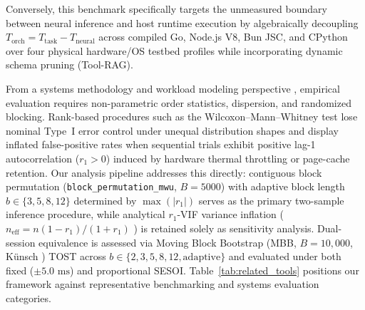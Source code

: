 \documentclass[11pt,a4paper]{article}
\begin{document}
Conversely, this benchmark specifically targets the unmeasured boundary between neural inference and host runtime execution by algebraically decoupling $T_{\text{orch}} = T_{\text{task}} - T_{\text{neural}}$ across compiled Go, Node.js V8, Bun JSC, and CPython over four physical hardware/OS testbed profiles while incorporating dynamic schema pruning (Tool-RAG).

From a systems methodology and workload modeling perspective \cite{kalibera2013rigorous, hoefler2015scientific, maricq2018taming, weaver2013nondeterminism, feitelson2015workload, zilberman2020benchmarking}, empirical evaluation requires non-parametric order statistics, dispersion, and randomized blocking. Rank-based procedures such as the Wilcoxon--Mann--Whitney test \cite{mann1947test} lose nominal Type~I error control under unequal distribution shapes \cite{zimmerman1993rank, fagerland2009wilcoxon} and display inflated false-positive rates when sequential trials exhibit positive lag-1 autocorrelation ($r_1 > 0$) induced by hardware thermal throttling or page-cache retention. Our analysis pipeline addresses this directly: contiguous block permutation (\texttt{block\_permutation\_mwu}, $B=5000$) with adaptive block length $b \in \{3, 5, 8, 12\}$ determined by $\max(|r_1|)$ serves as the primary two-sample inference procedure, while analytical $r_1$-VIF variance inflation ($n_{\text{eff}} = n(1-r_1)/(1+r_1)$ \cite{bayley1946effective, yue2004mann}) is retained solely as sensitivity analysis. Dual-session equivalence is assessed via Moving Block Bootstrap (MBB, $B=10{,}000$, Künsch \cite{kuensch1989jackknife}) TOST \cite{schuirmann1987comparison, lakens2017equivalence} across $b \in \{2, 3, 5, 8, 12, \text{adaptive}\}$ and evaluated under both fixed ($\pm 5.0\text{ ms}$) and proportional SESOI. Table~\ref{tab:related_tools} positions our framework against representative benchmarking and systems evaluation categories.
\end{document}
